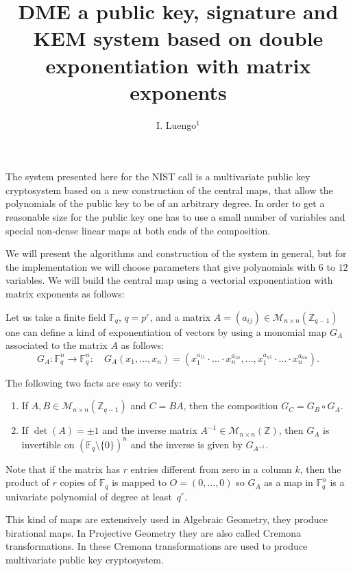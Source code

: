 \documentclass[12pt,a4paper]{amsart}
\title[DME]{DME a  public key, signature and KEM system based on double exponentiation  with matrix exponents}
\author[I. Luengo]{I. Luengo${^1}$}
\date{}
\theoremstyle{remark}
\theoremstyle{definition}
\newcommand\bz{{\mathbb Z}}
\newcommand\gfq{\mathbb{F}_q}
\begin{document}
 

\maketitle

The system presented here for the NIST call is a multivariate public key cryptosystem based on a new construction of the central maps,
that allow the polynomials of the public key to be of an arbitrary degree. In order to get a reasonable size for the public key one has 
to use a small number of variables and special non-dense linear maps at both ends of the composition. 

We will present the algorithms and construction of the system in general, but
for the implementation we will choose parameters that give polynomials with $6$ to $12$ variables. 
We will build the central map using a vectorial exponentiation with matrix exponents as follows:

Let us take a finite field $\gfq$, $q=p^e$, and a matrix $A=(a_{ij})\in \mathscr{M}_{n\times n}(\bz_{q-1})$ 
one can define a kind of exponentiation of vectors by using a monomial map $G_A$ associated to the matrix $A$ as follows:
\begin{equation}
\label{eq:1}
 G_A: \gfq^n \to \gfq^n: \quad G_A(x_1,\ldots, x_n)=(x_1^{a_{11}}\cdot\ldots\cdot   x_n^{a_{1n}}, \ldots, x_1^{a_{n1}}\cdot\ldots\cdot  x_n^{a_{nn}}).  
\end{equation}

The following two facts are easy to verify:
\begin{enumerate}[label=\alph*)]
\item If $A,B\in \mathscr{M}_{n\times n}(\bz_{q-1})$ and $C=B A$, then the composition $G_C=G_B \circ G_A$.
\item If $ \det(A) =\pm 1$ and the inverse matrix $A^{-1}\in \mathscr{M}_{n\times n}(\bz)$, then $G_{A}$
is invertible on $(\gfq\setminus \{0\})^n$ and the inverse is given by $G_{A^{-1}}$.
\end{enumerate}

Note that if the matrix has $r$ entries different from zero in a column $k$, then the product 
of $r$ copies of $\gfq$ is mapped to $O=(0,\ldots, 0)$ so $G_A$ as a map in $\gfq^n$ 
is a univariate polynomial of degree at least~$q^r$.

This kind of maps are extensively used in Algebraic Geometry,
they produce birational maps. In Projective Geometry they are  also called Cremona transformations. 
In \cite{D} these Cremona transformations are used to produce multivariate public key cryptosystem.
\end{document}
